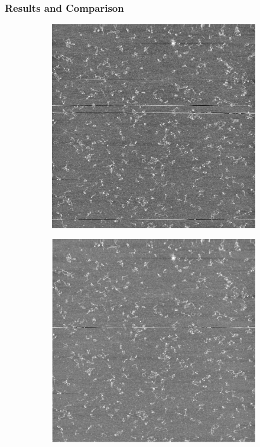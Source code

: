 \documentclass{article}
\begin{document}
\subsubsection{Results and Comparison}
\begin{figure}[H]
	\centering
	\begin{subfigure}[b]{0.321\textwidth}
		\includegraphics[width=\linewidth]{original}
		\caption{}
		\label{fig:origNoFilt}
	\end{subfigure} 
	\hspace{\fill}
	\begin{subfigure}[b]{0.321\textwidth}
		\includegraphics[width=\linewidth]{only_median}

\end{subfigure}
\end{figure}
\end{document}
